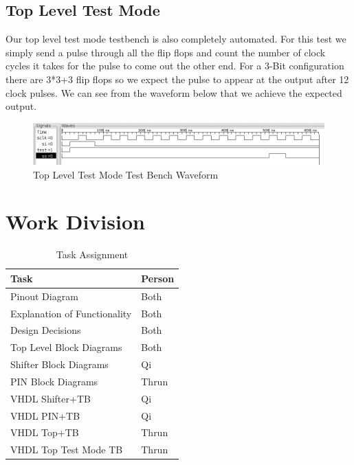 \documentclass{article}
\begin{document}
    \subsection{Top Level Test Mode}
        Our top level test mode testbench is also completely automated. For
        this test we simply send a pulse through all the flip flops and count
        the number of clock cycles it takes for the pulse to come out the other
        end. For a 3-Bit configuration there are 3*3+3 flip flops so we expect
        the pulse to appear at the output after 12 clock pulses. We can see
        from the waveform below that we achieve the expected output.
        \begin{figure}[H]
            \centering
            \includegraphics[width=\linewidth]{../../doc/vhdl_sim_pics/top_test.png}
            \caption{Top Level Test Mode Test Bench Waveform}
        \end{figure}

\section{Work Division}

\begin{table}[H]
    \centering
    \begin{tabular}{ll}
        \toprule
        \textbf{Task} & \textbf{Person}\\
        \midrule
        Pinout Diagram & Both \\
        Explanation of Functionality & Both \\
        Design Decisions & Both \\
        Top Level Block Diagrams & Both \\
        Shifter Block Diagrams & Qi \\
        PIN Block Diagrams & Thrun \\
        VHDL Shifter+TB & Qi \\
        VHDL PIN+TB & Qi \\
        VHDL Top+TB & Thrun \\
        VHDL Top Test Mode TB & Thrun \\
        \bottomrule
    \end{tabular}
    \caption{Task Assignment}
\end{table}
\end{document}
